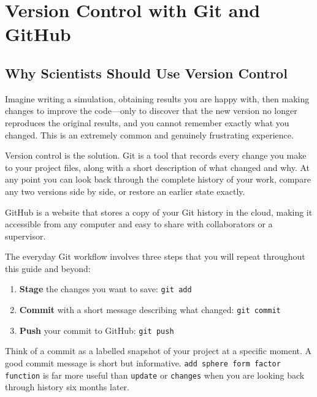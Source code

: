 \documentclass[nobib]{tufte-book}
\begin{document}
\chapter{Version Control with Git and GitHub}
\label{ch:git}

\section{Why Scientists Should Use Version Control}

Imagine writing a simulation, obtaining results you are happy with, then
making changes to improve the code---only to discover that the new version
no longer reproduces the original results, and you cannot remember exactly
what you changed.
This is an extremely common and genuinely frustrating experience.

Version control is the solution.
Git is a tool that records every change you make to your project files,
along with a short description of what changed and why.
At any point you can look back through the complete history of your work,
compare any two versions side by side, or restore an earlier state exactly.

GitHub is a website that stores a copy of your Git history in the cloud,
making it accessible from any computer and easy to share with collaborators
or a supervisor.

\begin{conceptbox}[title={The Core Git Workflow}]
The everyday Git workflow involves three steps that you will repeat throughout
this guide and beyond:
\begin{enumerate}
    \item \textbf{Stage} the changes you want to save:\quad
          \texttt{git add}
    \item \textbf{Commit} with a short message describing what changed:\quad
          \texttt{git commit}
    \item \textbf{Push} your commit to GitHub:\quad
          \texttt{git push}
\end{enumerate}
Think of a commit as a labelled snapshot of your project at a specific moment.
A good commit message is short but informative.
\texttt{add sphere form factor function} is far more useful than
\texttt{update} or \texttt{changes} when you are looking back through
history six months later.
\end{conceptbox}
\end{document}

